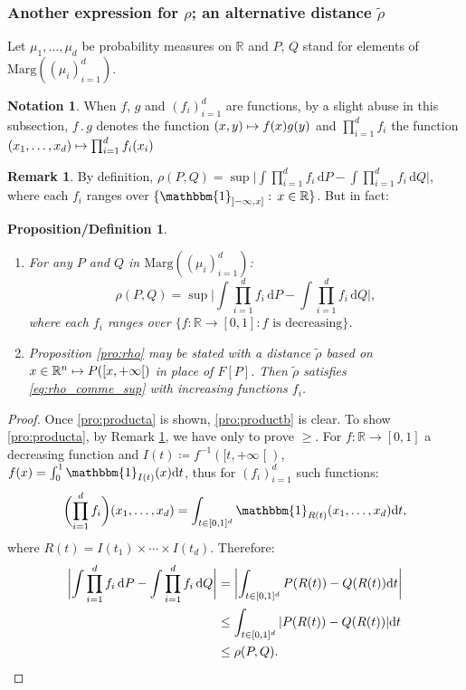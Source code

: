 \documentclass[JEP,XML,SOM,Unicode,NoEqCountersInSection,NoFloatCountersInSection,published]{cedram}
\newcommand{\ldot}{\mathbin{.}}
\newcommand\mto{\mathchoice{\longmapsto}{\mapsto}{\mapsto}{\mapsto}}
\theoremstyle{plain}
\newtheorem{prodefinition}[them]{Proposition/Definition}
\theoremstyle{definition}
\newtheorem{notation}[them]{Notation} %
\newtheorem{rem}[them]{Remark}
\newcommand{\dd}{\mathrm{d}}
\newcommand{\one}{\mathbbm{1}}
\newcommand{\eqdef}{\coloneqq}
\newcommand{\ma}{\mathrm{Marg}}
\newcommand{\R}{\mathbb{R}}
\newcommand{\op}{\mathopen}
\newcommand{\clo}{\mathclose}
\begin{document}
\subsubsection{Another expression for $\rho$; an alternative distance $\tilde \rho$}\label{ss:another}

Let $\mu_1,\ldots,\mu_d$ be probability measures on $\R$ and $P$, $Q$ stand for elements of $\ma((\mu_i)_{i=1}^d)$.

\begin{notation} When $f$, $g$ and $(f_i)_{i=1}^d$ are functions, by a slight abuse in this subsection, $f\ldot g$ denotes the function $(x,y)\mto f(x)g(y)$ and\/ $\prod_{i=1}^df_i$ the function $(x_1,\ldots ,x_d)\mto \prod_{i=1}^df_i(x_i)$
\end{notation}

\begin{rem}\label{rem:product}By definition, $\rho(P,Q)=\sup\bigl|\int \prod_{i=1}^df_i \,\dd P-\int \prod_{i=1}^df_i \,\dd Q \bigr|$, where each $f_i$ ranges over $\{\one_{\op]-\infty,x]}:\,x\in\R\}$. But in fact:
\end{rem}

\skpt
\begin{prodefinition}\label{pro:product}
\begin{enumerate}
\item\label{pro:producta}
For any $P$ and $Q$ in $\ma((\mu_i)_{i=1}^d)$:\vspace*{-3pt}
\begin{equation}\label{eq:rho_comme_sup}
\rho(P,Q)=\sup\biggl|\int\prod_{i=1}^df_i \,\dd P-\int \prod_{i=1}^df_i \,\dd Q \biggr|,
\end{equation}
where each $f_i$ ranges over $\{f:\R\to[0,1]: f\text{ is decreasing}\}$.

\item\label{pro:productb}
Proposition \ref{pro:rho} may be stated with a distance $\tilde\rho$ based on $x\in \R^n\mto P([x,+\infty\clo[)$ in place of $F[P]$. Then $\tilde\rho$ satisfies \eqref{eq:rho_comme_sup} with \emph{increasing} functions $f_i$.
\end{enumerate}
\end{prodefinition}

\begin{proof}
Once \eqref{pro:producta} is shown, \eqref{pro:productb} is clear. To show \eqref{pro:producta}, by Remark \ref{rem:product}, we have only to prove $\geqslant$. For $f:\R\to [0,1]$ a decreasing function and $I(t)\eqdef f^{-1}([t,+\infty\clo[)$, $f(x)=\int_0^1 \one_{I(t)}(x)\dd t$, thus for $(f_i)_{i=1}^d$ such functions:
\[\biggl(\prod_{i=1}^df_i\biggr) (x_1,\ldots, x_d)=\int_{t\in[0,1]^d}\one_{R(t)}(x_1,\ldots,x_d)\dd t,\]
where $R(t)=I(t_1)\times\cdots\times I(t_d)$. Therefore:
\begin{align*}
\biggl|\int \prod_{i=1}^d f_i\,\dd P-\int \prod_{i=1}^d f_i \,\dd Q\biggr|&=\biggl|\int_{t\in[0,1]^d}P(R(t))-Q(R(t))\dd t\biggr|\\
&\leq \int_{t\in[0,1]^d}|P(R(t))-Q(R(t))|\dd t\\
&\leq \rho(P,Q).\qedhere
\end{align*}
\end{proof}
\end{document}
